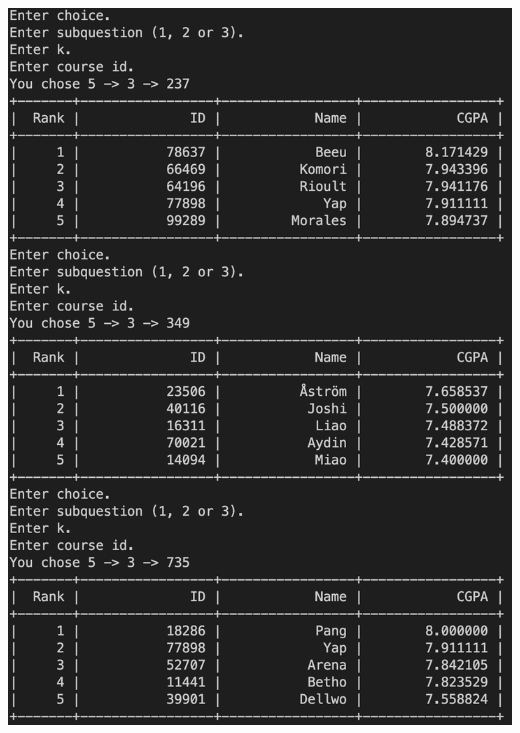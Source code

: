 \documentclass[12pt]{amsart}
\begin{document}
    \includegraphics[scale = 0.5]{5_3.png}
\end{document}

